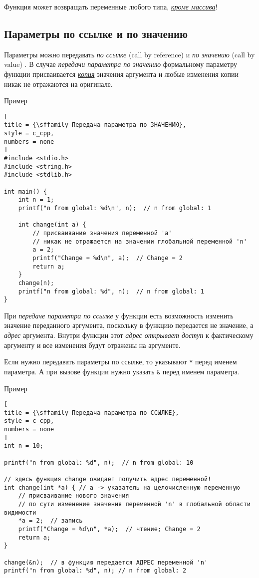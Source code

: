 \documentclass[%
	11pt,
	a4paper,
	utf8,
		]{article}
\begin{document}
Функция может возвращать переменные любого типа, \underline{\itshape кроме массива}! \cite[]{koltzov-c-lang:2019}

\subsection{Параметры по ссылке и по значению}

Параметры можно передавать \emph{по ссылке} (call by reference) и \emph{по значению} (call by value) \cite[]{koltzov-c-lang:2019}. В случае \emph{передачи параметра по значению} формальному параметру функции присваивается \underline{\itshape копия} значения аргумента и любые изменения копии никак не отражаются на оригинале.

Пример
\begin{lstlisting}[
title = {\sffamily Передача параметра по ЗНАЧЕНИЮ},
style = c_cpp,
numbers = none
]
#include <stdio.h>
#include <string.h>
#include <stdlib.h>

int main() {
	int n = 1;
	printf("n from global: %d\n", n);  // n from global: 1
	
	int change(int a) {
		// присваивание значения переменной 'a'
		// никак не отражается на значении глобальной переменной 'n'
		a = 2;
		printf("Change = %d\n", a);  // Change = 2
		return a;
	}
	change(n);
	printf("n from global: %d", n);  // n from global: 1
}
\end{lstlisting}

При \emph{передаче параметра по ссылке} у функции есть возможность изменить значение переданного аргумента, поскольку в функцию передается не значение, а \emph{адрес} аргумента. Внутри функции этот \emph{адрес открывает доступ} к фактическому аргументу и все изменения будут отражены на аргументе.

Если нужно передавать параметры по ссылке, то указывают \verb|*| перед именем параметра. А при вызове функции нужно указать \verb|&| перед именем параметра. 

Пример
\begin{lstlisting}[
title = {\sffamily Передача параметра по ССЫЛКЕ},
style = c_cpp,
numbers = none
]
int n = 10;

printf("n from global: %d", n);  // n from global: 10

// здесь функция change ожидает получить адрес переменной!
int change(int *a) { // a -> указатель на целочисленную переменную
	// присваивание нового значения
	// по сути изменение значения переменной 'n' в глобальной области видимости
    *a = 2;  // запись
    printf("Change = %d\n", *a);  // чтение; Change = 2
    return a;
}

change(&n);  // в функцию передается АДРЕС переменной 'n'
printf("n from global: %d", n); // n from global: 2
\end{lstlisting}
\end{document}
